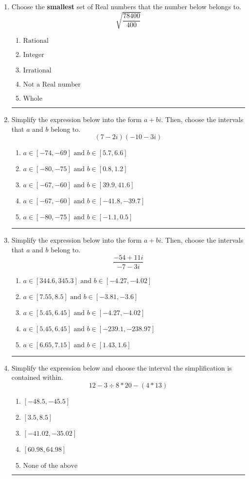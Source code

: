 \documentclass[14pt]{extbook}
\newcommand{\litem}[1]{\item#1\hspace*{-1cm}\rule{\textwidth}{0.4pt}}
\begin{document}
\begin{enumerate}
\litem{
Choose the \textbf{smallest} set of Real numbers that the number below belongs to.\[ \sqrt{\frac{78400}{400}} \]\begin{enumerate}[label=\Alph*.]
\item \( \text{Rational} \)
\item \( \text{Integer} \)
\item \( \text{Irrational} \)
\item \( \text{Not a Real number} \)
\item \( \text{Whole} \)

\end{enumerate} }
\litem{
Simplify the expression below into the form $a+bi$. Then, choose the intervals that $a$ and $b$ belong to.\[ (7 - 2 i)(-10 - 3 i) \]\begin{enumerate}[label=\Alph*.]
\item \( a \in [-74, -69] \text{ and } b \in [5.7, 6.6] \)
\item \( a \in [-80, -75] \text{ and } b \in [0.8, 1.2] \)
\item \( a \in [-67, -60] \text{ and } b \in [39.9, 41.6] \)
\item \( a \in [-67, -60] \text{ and } b \in [-41.8, -39.7] \)
\item \( a \in [-80, -75] \text{ and } b \in [-1.1, 0.5] \)

\end{enumerate} }
\litem{
Simplify the expression below into the form $a+bi$. Then, choose the intervals that $a$ and $b$ belong to.\[ \frac{-54 + 11 i}{-7 - 3 i} \]\begin{enumerate}[label=\Alph*.]
\item \( a \in [344.6, 345.3] \text{ and } b \in [-4.27, -4.02] \)
\item \( a \in [7.55, 8.5] \text{ and } b \in [-3.81, -3.6] \)
\item \( a \in [5.45, 6.45] \text{ and } b \in [-4.27, -4.02] \)
\item \( a \in [5.45, 6.45] \text{ and } b \in [-239.1, -238.97] \)
\item \( a \in [6.65, 7.15] \text{ and } b \in [1.43, 1.6] \)

\end{enumerate} }
\litem{
Simplify the expression below and choose the interval the simplification is contained within.\[ 12 - 3 \div 8 * 20 - (4 * 13) \]\begin{enumerate}[label=\Alph*.]
\item \( [-48.5, -45.5] \)
\item \( [3.5, 8.5] \)
\item \( [-41.02, -35.02] \)
\item \( [60.98, 64.98] \)
\item \( \text{None of the above} \)


\end{enumerate}}
\end{enumerate}
\end{document}
